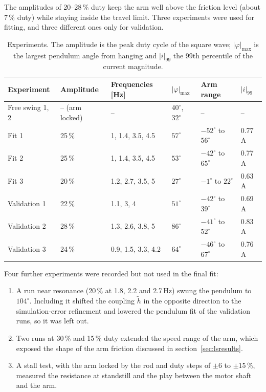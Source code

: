 \documentclass[a4paper,11pt]{article}
\begin{document}
The amplitudes of 20--28\,\% duty keep the arm well above the friction level (about 7\,\% duty) while staying inside the travel limit. Three experiments were used for fitting, and three different ones only for validation.

\begin{table}[h]
\centering
\caption{Experiments. The amplitude is the peak duty cycle of the square wave; $|\varphi|_{\max}$ is the largest pendulum angle from hanging and $|i|_{99}$ the 99th percentile of the current magnitude.}
\label{tab:runs}
\small
\begin{tabular}{@{}llllll@{}}
\toprule
Experiment & Amplitude & Frequencies [Hz] & $|\varphi|_{\max}$ & Arm range & $|i|_{99}$ \\
\midrule
Free swing 1, 2 & -- (arm locked) & -- & $40^\circ$, $32^\circ$ & -- & -- \\
Fit 1 & 25\,\% & 1, 1.4, 3.5, 4.5 & $57^\circ$ & $-52^\circ$ to $56^\circ$ & 0.77\,A \\
Fit 2 & 25\,\% & 1, 1.4, 3.5, 4.5 & $53^\circ$ & $-42^\circ$ to $65^\circ$ & 0.77\,A \\
Fit 3 & 20\,\% & 1.2, 2.7, 3.5, 5 & $27^\circ$ & $-1^\circ$ to $22^\circ$ & 0.63\,A \\
Validation 1 & 22\,\% & 1.1, 3, 4 & $51^\circ$ & $-42^\circ$ to $39^\circ$ & 0.69\,A \\
Validation 2 & 28\,\% & 1.3, 2.6, 3.8, 5 & $86^\circ$ & $-41^\circ$ to $52^\circ$ & 0.83\,A \\
Validation 3 & 24\,\% & 0.9, 1.5, 3.3, 4.2 & $64^\circ$ & $-46^\circ$ to $67^\circ$ & 0.76\,A \\
\bottomrule
\end{tabular}
\end{table}

Four further experiments were recorded but not used in the final fit:
\begin{enumerate}
  \item A run near resonance (20\,\% at 1.8, 2.2 and 2.7\,Hz) swung the pendulum to $104^\circ$. Including it shifted the coupling $\tilde h$ in the opposite direction to the simulation-error refinement and lowered the pendulum fit of the validation runs, so it was left out.
  \item Two runs at 30\,\% and 15\,\% duty extended the speed range of the arm, which exposed the shape of the arm friction discussed in section~\ref{sec:lsresults}.
  \item A stall test, with the arm locked by the rod and duty steps of $\pm 6$ to $\pm 15$\,\%, measured the resistance at standstill and the play between the motor shaft and the arm.
\end{enumerate}
\end{document}
